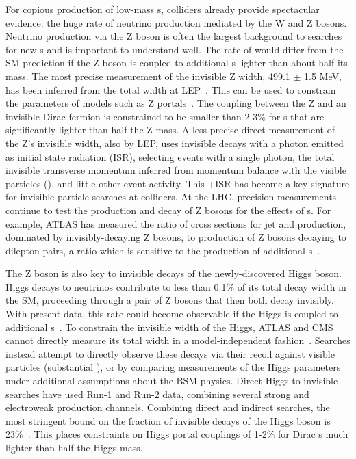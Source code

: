 For copious production of low-mass {\IP}s, colliders already provide spectacular evidence: the huge rate of neutrino production mediated by the W and Z bosons. 
Neutrino production via the Z boson is often the largest background to searches for new {\IP}s and is important to understand well.
The rate of would differ from the SM prediction if the Z boson is coupled to additional {\IP}s lighter than about half its mass.
The most precise measurement of the invisible Z width, 499.1 $\pm$ 1.5 MeV, has been inferred from the total width at LEP~\cite{ALEPH:2005ab}.
This can be used to constrain the parameters of models such as Z portals~\cite{Carena:2003aj,Escudero:2016gzx}.
The coupling between the Z and an invisible Dirac fermion is constrained to be smaller than 2-3\% for {\IP}s that are significantly lighter than half the Z mass.
A less-precise direct measurement of the Z's invisible width, also by LEP, uses invisible decays with a photon emitted as initial state radiation (ISR), selecting events with a single photon, the total invisible transverse momentum inferred from momentum balance with the visible particles (\MET), and little other event activity.
This \MET+ISR has become a key signature for invisible particle searches at colliders. 
At the LHC, precision measurements continue to test the production and decay of Z bosons for the effects of {\IP}s. 
For example, ATLAS has measured the ratio of cross sections for jet and \MET production, dominated by invisibly-decaying Z bosons, to production of Z bosons decaying to dilepton pairs, a ratio which is sensitive to the production of additional {\IP}s~\cite{Aaboud:2017buf}. 

The Z boson is also key to invisible decays of the newly-discovered Higgs boson.
Higgs decays to neutrinos contribute to less than 0.1\% of its total decay width in the SM, proceeding through a pair of Z bosons that then both decay invisibly.
With present data, this rate could become observable if the Higgs is coupled to additional {\IP}s~\cite{Khachatryan:2016vau,Aad:2015pla}.
To constrain the invisible width of the Higgs, ATLAS and CMS cannot directly measure its total width in a model-independent fashion~\cite{Dobrescu:2012td}.
Searches instead attempt to directly observe these decays via their recoil against visible particles (substantial \MET), or by comparing measurements of the Higgs parameters under additional assumptions about the BSM physics.
Direct Higgs to invisible searches have used Run-1 and Run-2 data, combining several strong and electroweak production channels.
Combining direct and indirect searches, the most stringent bound on the fraction of invisible decays of the Higgs boson is 23\%~\cite{Khachatryan:2016whc,Aad:2015pla}.
This places constraints on Higgs portal couplings of 1-2\% for Dirac {\IP}s much lighter than half the Higgs mass. 

